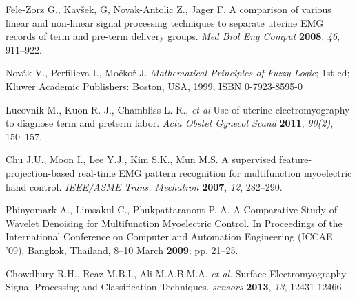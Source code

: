 \documentclass[bioengineering,article,submit,moreauthors,pdftex,10pt,a4paper]{mdpi}
\begin{document}
\begin{thebibliography}{999}
Fele-Zorz G., Kavšek, G, Novak-Antolic Z., Jager F.  A comparison of various linear and non-linear signal processing techniques to separate uterine EMG records of term and pre-term delivery groups. {\em Med Biol Eng Comput} {\bf 2008}, {\em 46}, 911–922.	

Novák V., Perfilieva I., Močkoř J. {\em Mathematical Principles of Fuzzy Logic}; 1st ed; Kluwer Academic Publishers: Boston,
USA, 1999; ISBN 0-7923-8595-0


Lucovnik M., Kuon R. J., Chambliss L. R., {\em et al} Use of uterine electromyography to diagnose term and preterm labor. {\em Acta Obstet Gynecol Scand} {\bf 2011}, {\em 90(2)}, 150–157.	

Chu J.U., Moon I., Lee Y.J., Kim S.K., Mun M.S. A supervised feature-projection-based
real-time EMG pattern recognition for multifunction myoelectric hand control. {\em IEEE/ASME Trans. Mechatron} {\bf 2007}, {\em 12}, 282–290.


Phinyomark A., Limsakul C., Phukpattaranont P. A. A Comparative Study of Wavelet Denoising
for Multifunction Myoelectric Control. In Proceedings of the International Conference on
Computer and Automation Engineering (ICCAE ’09), Bangkok, Thailand, 8–10 March {\bf 2009};
pp. 21–25.

Chowdhury R.H., Reaz M.B.I., Ali M.A.B.M.A. {\em et al}. Surface Electromyography Signal Processing and
Classification Techniques. {\em sensors} {\bf 2013}, {\em 13}, 12431-12466.

                                                             




\end{thebibliography}
\end{document}
